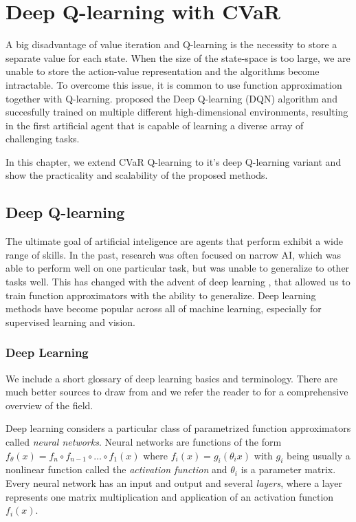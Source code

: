 \chapter{Deep Q-learning with CVaR}\label{ch:dqn}

A big disadvantage of value iteration and Q-learning is the necessity to store a separate value for each state. When the size of the state-space is too large, we are unable to store the action-value representation and the algorithms become intractable. To overcome this issue, it is common to use function approximation together with Q-learning. \citet{mnih2015human} proposed the Deep Q-learning (DQN) algorithm and succesfully trained on multiple different high-dimensional environments, resulting in the first artificial agent that is capable of learning a diverse array of challenging tasks.

In this chapter, we extend CVaR Q-learning to it's deep Q-learning variant and show the practicality and scalability of the proposed methods.

\section{Deep Q-learning}
The ultimate goal of artificial inteligence are agents that perform exhibit a wide range of skills. In the past, research was often focused on narrow AI, which was able to perform well on one particular task, but was unable to generalize to other tasks well. This has changed with the advent of deep learning \citep{krizhevsky2012imagenet}, that allowed us to train function approximators with the ability to generalize. Deep learning methods have become popular across all of machine learning, especially for supervised learning and vision.

\subsection{Deep Learning}

We include a short glossary of deep learning basics and terminology. There are much better sources to draw from and we refer the reader to \citet{goodfellow2016deep} for a comprehensive overview of the field.

Deep learning considers a particular class of parametrized function approximators called \textit{neural networks}. 
Neural networks are functions of the form $f_\theta(x) = f_n \circ f_{n-1} \circ\hdots\circ  f_1(x)$ where $f_i(x) = g_i(\theta_i x)$ with $g_i$ being usually a nonlinear function called the \textit{activation function} and $\theta_i$ is a parameter matrix. Every neural network has an input and output and several \textit{layers}, where a layer represents one matrix multiplication and application of an activation function $f_i(x)$.


